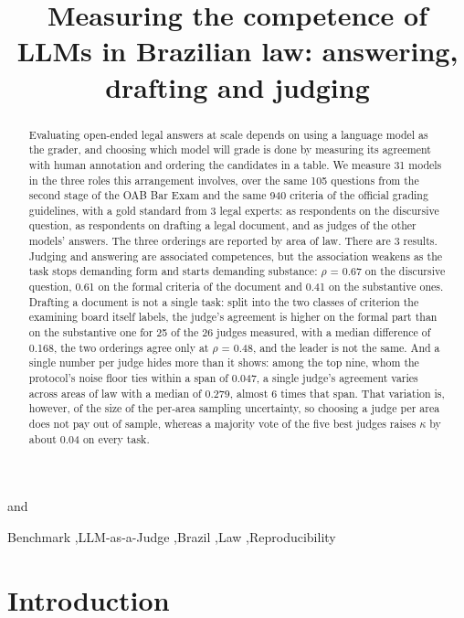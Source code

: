 \documentclass{IOS-Book-Article}
\begin{document}
\begin{frontmatter}
\title{Measuring the competence of LLMs in Brazilian law: answering, drafting and judging}
\author[A]{ }
and
\author[A]{ }
\address[A]{Instituto de Ciências Matemáticas e de Computação, Universidade de São Paulo}
\begin{abstract}
Evaluating open-ended legal answers at scale depends on using a language model as the grader, and choosing which model will grade is done by measuring its agreement with human annotation and ordering the candidates in a table. We measure 31 models in the three roles this arrangement involves, over the same 105 questions from the second stage of the OAB Bar Exam and the same 940 criteria of the official grading guidelines, with a gold standard from 3 legal experts: as respondents on the discursive question, as respondents on drafting a legal document, and as judges of the other models' answers. The three orderings are reported by area of law. There are 3 results. Judging and answering are associated competences, but the association weakens as the task stops demanding form and starts demanding substance: $\rho$ = 0.67 on the discursive question, 0.61 on the formal criteria of the document and 0.41 on the substantive ones. Drafting a document is not a single task: split into the two classes of criterion the examining board itself labels, the judge's agreement is higher on the formal part than on the substantive one for 25 of the 26 judges measured, with a median difference of 0.168, the two orderings agree only at $\rho$ = 0.48, and the leader is not the same. And a single number per judge hides more than it shows: among the top nine, whom the protocol's noise floor ties within a span of 0.047, a single judge's agreement varies across areas of law with a median of 0.279, almost 6 times that span. That variation is, however, of the size of the per-area sampling uncertainty, so choosing a judge per area does not pay out of sample, whereas a majority vote of the five best judges raises $\kappa$ by about 0.04 on every task.
\end{abstract}
\begin{keyword}
Benchmark \sep LLM-as-a-Judge \sep Brazil \sep Law \sep Reproducibility
\end{keyword}
\end{frontmatter}

\section{Introduction}
\end{document}
